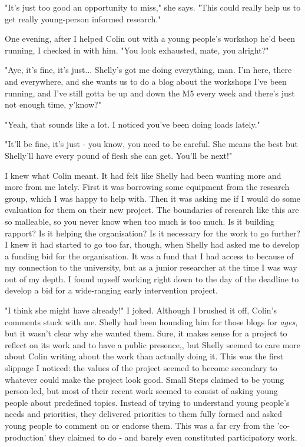 "It's just too good an opportunity to miss," she says. "This could really help us to get really young-person informed research."

One evening, after I helped Colin out with a young people's workshop he'd been running, I checked in with him. "You look exhausted, mate, you alright?"

"Aye, it's fine, it's just... Shelly's got me doing everything, man. I'm here, there and everywhere, and she wants us to do a blog about the workshops I've been running, and I've still gotta be up and down the M5 every week and there's just not enough time, y'know?"

"Yeah, that sounds like a lot. I noticed you've been doing loads lately."

"It'll be fine, it's just - you know, you need to be careful. She means the best but Shelly'll have every pound of flesh she can get. You'll be next!"

I knew what Colin meant. It had felt like Shelly had been wanting more and more from me lately. First it was borrowing some equipment from the research group, which I was happy to help with. Then it was asking me if I would do some evaluation for them on their new project. The boundaries of research like this are so malleable, so you never know when too much is too much. Is it building rapport? Is it helping the organisation? Is it necessary for the work to go further? I knew it had started to go too far, though, when Shelly had asked me to develop a funding bid for the organisation. It was a fund that I had access to because of my connection to the university, but as a junior researcher at the time I was way out of my depth. I found myself working right down to the day of the deadline to develop a bid for a wide-ranging early intervention project. 

"I think she might have already!" I joked. Although I brushed it off, Colin's comments stuck with me. Shelly had been hounding him for those blogs for \textit{ages}, but it wasn't clear why she wanted them. Sure, it makes sense for a project to reflect on its work and to have a public presence,, but Shelly seemed to care more about Colin writing about the work than actually doing it. This was the first slippage I noticed: the values of the project seemed to become secondary to whatever could make the project look good. Small Steps claimed to be young person-led, but most of their recent work seemed to consist of asking young people about predefined topics. Instead of trying to understand young people's needs and priorities, they delivered priorities to them fully formed and asked young people to comment on or endorse them. This was a far cry from the 'co-production' they claimed to do - and barely even constituted participatory work. 

